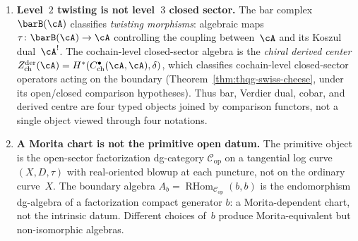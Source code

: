 \begin{enumerate}

\item \textbf{Level~$2$ twisting is not level~$3$ closed sector.}
 The bar complex $\barB(\cA)$ classifies
 \emph{twisting morphisms}:
 algebraic maps $\tau \colon \barB(\cA) \to \cA$
 controlling the coupling between~$\cA$ and its
 Koszul dual~$\cA^!$.
 The cochain-level closed-sector algebra is the
 \emph{chiral derived center}
 $Z^{\mathrm{der}}_{\mathrm{ch}}(\cA)
 = H^*(C^\bullet_{\mathrm{ch}}(\cA, \cA), \delta)$,
 which classifies cochain-level closed-sector operators acting on the
 boundary
 (Theorem~\ref{thm:thqg-swiss-cheese}, under its open/closed comparison
 hypotheses).
 Thus bar, Verdier dual, cobar, and derived centre are four typed
 objects joined by comparison functors, not a single object viewed
 through four notations.

\item \textbf{A Morita chart is not the primitive open datum.}
 The primitive object is the open-sector
 factorization dg-category
 $\mathcal{C}_{\mathrm{op}}$ on a tangential log
 curve $(X, D, \tau)$ with real-oriented blowup at
 each puncture, not on the ordinary curve~$X$.
 The boundary algebra
 $A_b=\operatorname{RHom}_{\mathcal{C}_{\mathrm{op}}}(b,b)$
 is the endomorphism dg-algebra of a factorization compact generator
 $b$: a Morita-dependent chart,
 not the intrinsic datum.
 Different choices of~$b$ produce Morita-equivalent
 but non-isomorphic algebras.


\end{enumerate}
